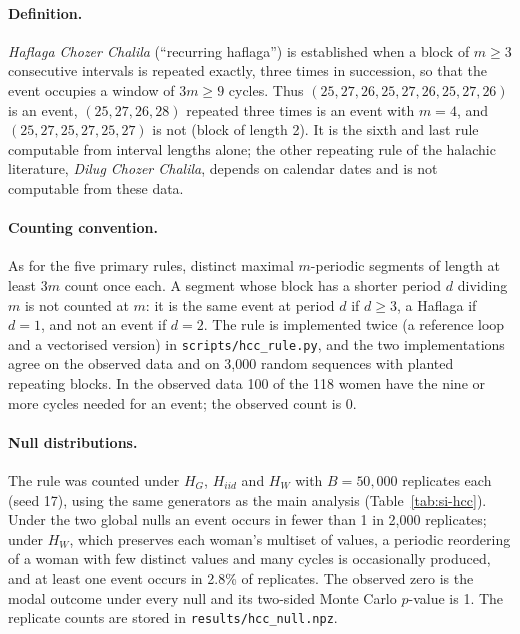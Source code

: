 \documentclass[12pt]{article}
\newcommand{\HG}{H_{G}}
\newcommand{\HI}{H_{iid}}
\newcommand{\HW}{H_{W}}
\begin{document}
\paragraph{Definition.} \textit{Haflaga Chozer Chalila} (``recurring haflaga'') is
established when a block of $m \geq 3$ consecutive intervals is repeated exactly,
three times in succession, so that the event occupies a window of $3m \geq 9$ cycles.
Thus $(25, 27, 26, 25, 27, 26, 25, 27, 26)$ is an event, $(25, 27, 26, 28)$ repeated three
times is an event with $m = 4$, and $(25, 27, 25, 27, 25, 27)$ is not (block of length 2).
It is the sixth and last rule computable from interval lengths alone; the other
repeating rule of the halachic literature, \textit{Dilug Chozer Chalila}, depends on
calendar dates and is not computable from these data.

\paragraph{Counting convention.} As for the five primary rules, distinct maximal
$m$-periodic segments of length at least $3m$ count once each. A segment whose block has
a shorter period $d$ dividing $m$ is not counted at $m$: it is the same event at period
$d$ if $d \geq 3$, a Haflaga if $d = 1$, and not an event if $d = 2$. The rule is
implemented twice (a reference loop and a vectorised version) in
\texttt{scripts/hcc\_rule.py}, and the two implementations agree on the observed data and
on 3,000 random sequences with planted repeating blocks. In the observed data 100 of the
118 women have the nine or more cycles needed for an event; the observed count is 0.

\paragraph{Null distributions.} The rule was counted under $\HG$, $\HI$ and $\HW$
with $B = 50{,}000$ replicates each (seed 17), using the same generators as the main
analysis (Table~\ref{tab:si-hcc}). Under the two global nulls an event occurs in fewer
than 1 in 2,000 replicates; under $\HW$, which preserves each woman's multiset of
values, a periodic reordering of a woman with few distinct values and many cycles is
occasionally produced, and at least one event occurs in 2.8\% of replicates. The
observed zero is the modal outcome under every null and its two-sided Monte Carlo
$p$-value is 1. The replicate counts are stored in \texttt{results/hcc\_null.npz}.
\end{document}
